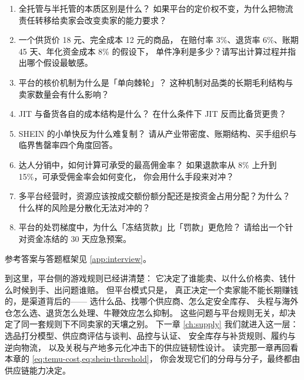 
\begin{interview}[本章对应的面试题]
\begin{enumerate}
  \item 全托管与半托管的本质区别是什么？
        如果平台的定价权不变，为什么把物流责任转移给卖家会改变卖家的能力要求？
  \item 一个供货价 18 元、完全成本 12 元的商品，
        在赔付率 3\%、退货率 6\%、账期 45 天、年化资金成本 8\% 的假设下，
        单件净利是多少？请写出计算过程并指出哪个假设最敏感。
  \item 平台的核价机制为什么是「单向棘轮」？
        这种机制对品类的长期毛利结构与卖家数量会有什么影响？
  \item JIT 与备货各自的成本结构是什么？
        在什么条件下 JIT 反而比备货更贵？
  \item SHEIN 的小单快反为什么难复制？
        请从产业带密度、账期结构、买手组织与临界售罄率四个角度回答。
  \item 达人分销中，如何计算可承受的最高佣金率？
        如果退款率从 8\% 上升到 15\%，可承受佣金率会如何变化，
        你会用什么手段来对冲？
  \item 多平台经营时，资源应该按成交额份额分配还是按资金占用分配？为什么？
        什么样的风险是分散化无法对冲的？
  \item 平台的处罚梯度中，为什么「冻结货款」比「罚款」更危险？
        请给出一个针对资金冻结的 30 天应急预案。
\end{enumerate}
参考答案与答题框架见 \cref{app:interview}。
\end{interview}

到这里，平台侧的游戏规则已经讲清楚：
它决定了谁能卖、以什么价格卖、钱什么时候到手、出问题谁赔。
但平台模式只是，
真正决定一个卖家能不能长期赚钱的，是渠道背后的——
选什么品、找哪个供应商、怎么定安全库存、
头程与海外仓怎么选、退货怎么处理、牛鞭效应怎么抑制。
这些问题与平台规则无关，却决定了同一套规则下不同卖家的天壤之别。
下一章 \cref{ch:supply} 我们就进入这一层：
选品打分模型、供应商评估与谈判、品控与认证、
安全库存与补货规则、履约与逆向物流，
以及关税与产地多元化冲击下的供应链韧性设计。
读完那一章再回看本章的 \cref{eq:temu-cost,eq:shein-threshold}，
你会发现它们的分母与分子，最终都由供应链能力决定。
